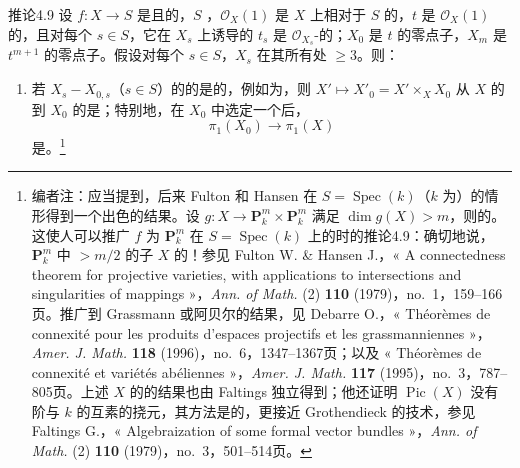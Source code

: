 \begin{SGAresult}{推论}{4.9}
设 $f:X\to S$ 是且的，$S$ ，$\mathcal O_X(1)$ 是 $X$ 上相对于 $S$ 的，$t$ 是 $\mathcal O_X(1)$ 的，且对每个 $s\in S$，它在 $X_s$ 上诱导的 $t_s$ 是 $\mathcal O_{X_s}$-的；$X_0$ 是 $t$ 的零点子，$X_m$ 是 $t^{m+1}$ 的零点子。假设对每个 $s\in S$，$X_s$ 在其所有处 $\geq3$。则：
\begin{enumerate}
\item[a)] 若 $X_s-X_{0,s}$（$s\in S$）的的是的，例如为，则 $X'\mapsto X'_0=X'\times_XX_0$ 从 $X$ 的到 $X_0$ 的是；特别地，在 $X_0$ 中选定一个后，
\[
 \pi_1(X_0)\longrightarrow\pi_1(X)
\]
是。\footnote{编者注：应当提到，后来 Fulton 和 Hansen 在 $S=\operatorname{Spec}(k)$（$k$ 为）的情形得到一个出色的结果。设 $g:X\to\mathbf P_k^m\times\mathbf P_k^m$ 满足 $\dim g(X)>m$，则的。这使人可以推广 $f$ 为 $\mathbf P_k^m$ 在 $S=\operatorname{Spec}(k)$ 上的时的推论4.9：确切地说，$\mathbf P_k^m$ 中 $>m/2$ 的子 $X$ 的！参见 Fulton W. \& Hansen J.，« A connectedness theorem for projective varieties, with applications to intersections and singularities of mappings »，\emph{Ann. of Math.} (2) \textbf{110} (1979)，no.~1，159--166页。推广到 Grassmann 或阿贝尔的结果，见 Debarre O.，« Théorèmes de connexité pour les produits d'espaces projectifs et les grassmanniennes »，\emph{Amer. J. Math.} \textbf{118} (1996)，no.~6，1347--1367页；以及 « Théorèmes de connexité et variétés abéliennes »，\emph{Amer. J. Math.} \textbf{117} (1995)，no.~3，787--805页。上述 $X$ 的的结果也由 Faltings 独立得到；他还证明 $\operatorname{Pic}(X)$ 没有阶与 $k$ 的互素的挠元，其方法是的，更接近 Grothendieck 的技术，参见 Faltings G.，« Algebraization of some formal vector bundles »，\emph{Ann. of Math.} (2) \textbf{110} (1979)，no.~3，501--514页。}

\end{enumerate}
\end{SGAresult}
